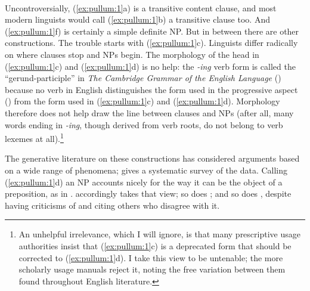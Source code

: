 \documentclass[output=paper,colorlinks,citecolor=brown
]{langscibook}
\begin{document}
\ea
\label{ex:pullum:1}
    \ea {} \\
    \ex {}  \\
    \ex {} \\
    \ex {} \\
    \ex {} \\
    \ex {} \\
    \z
\z
\noindent
Uncontroversially, (\ref{ex:pullum:1}a) is a transitive content clause, and most
modern linguists would call (\ref{ex:pullum:1}b) a transitive clause too.
And (\ref{ex:pullum:1}f) is certainly a simple definite NP. But in between there are
other constructions. The trouble starts with (\ref{ex:pullum:1}c). Linguists differ
radically on where clauses stop and NPs begin.
The morphology of the head in (\ref{ex:pullum:1}c) and (\ref{ex:pullum:1}d) is no help:
the \textit{-ing} verb form is called the ``gerund-participle'' in
\textit{The Cambridge Grammar of the English Language}
(\citealt{HuddPull02}) because no verb in English distinguishes the form
used in the progressive aspect () from the form used
in (\ref{ex:pullum:1}c) and (\ref{ex:pullum:1}d). Morphology therefore does not help draw the line
between clauses and NPs (after all, many words ending in
\mbox{\itshape-ing}, though derived from verb roots, do not belong
to verb lexemes at all).\footnote{%
   An unhelpful irrelevance, which I will ignore, is that many
   prescriptive usage authorities insist that (\ref{ex:pullum:1}c) is a deprecated
   form that should be corrected to (\ref{ex:pullum:1}d). I take this view to be
   untenable; the more scholarly usage manuals reject it, noting the
   free variation between them found throughout English literature.}

The generative literature on these constructions has considered
arguments based on a wide range of phenomena; \citet{Pullum91}
gives a systematic survey of the data. Calling (\ref{ex:pullum:1}d) an NP accounts
nicely for the way it can be the object of a preposition, as in
. \citet[222--223]{Jackendoff77} accordingly takes that view; so
does \citet{Pullum91}; and so does \citet{Blevins05}, despite having
criticisms of \citet{Pullum91} and citing others who disagree with it.
\end{document}
